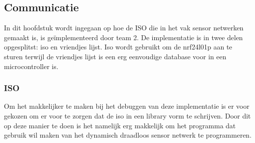\subsection{Communicatie} \label{sec:communication}
In dit hoofdstuk wordt ingegaan op hoe de ISO die in het vak sensor netwerken gemaakt is, is geïmplementeerd door team 2. De implementatie is in twee delen opgesplitst: iso en vriendjes lijst. Iso wordt gebruikt om de nrf24l01p aan te sturen terwijl de vriendjes lijst is een erg eenvoudige database voor in een microcontroller is.
\subsubsection{ISO}
    Om het makkelijker te maken bij het debuggen van deze implementatie is er voor gekozen om er voor te zorgen dat de iso in een library vorm te schrijven. Door dit op deze manier te doen is het namelijk erg makkelijk om het programma dat gebruik wil maken van het dynamisch draadloos sensor netwerk te programmeren.

